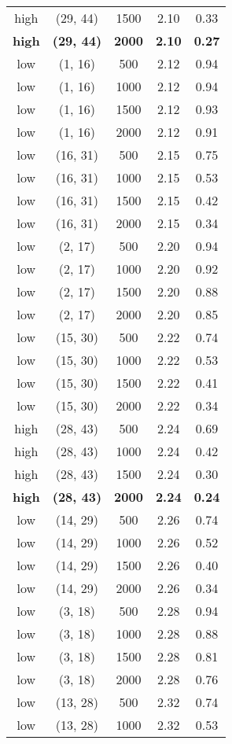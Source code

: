 \begin{tabular}{c c c c c}
high & (29, 44) &  1500 & 2.10 & 0.33 \\
\textbf{high} & \textbf{(29, 44)} & \textbf{ 2000} & \textbf{2.10} & \textbf{0.27} \\
low & (1, 16) &  500 & 2.12 & 0.94 \\
low & (1, 16) &  1000 & 2.12 & 0.94 \\
low & (1, 16) &  1500 & 2.12 & 0.93 \\
low & (1, 16) &  2000 & 2.12 & 0.91 \\
low & (16, 31) &  500 & 2.15 & 0.75 \\
low & (16, 31) &  1000 & 2.15 & 0.53 \\
low & (16, 31) &  1500 & 2.15 & 0.42 \\
low & (16, 31) &  2000 & 2.15 & 0.34 \\
low & (2, 17) &  500 & 2.20 & 0.94 \\
low & (2, 17) &  1000 & 2.20 & 0.92 \\
low & (2, 17) &  1500 & 2.20 & 0.88 \\
low & (2, 17) &  2000 & 2.20 & 0.85 \\
low & (15, 30) &  500 & 2.22 & 0.74 \\
low & (15, 30) &  1000 & 2.22 & 0.53 \\
low & (15, 30) &  1500 & 2.22 & 0.41 \\
low & (15, 30) &  2000 & 2.22 & 0.34 \\
high & (28, 43) &  500 & 2.24 & 0.69 \\
high & (28, 43) &  1000 & 2.24 & 0.42 \\
high & (28, 43) &  1500 & 2.24 & 0.30 \\
\textbf{high} & \textbf{(28, 43)} & \textbf{ 2000} & \textbf{2.24} & \textbf{0.24} \\
low & (14, 29) &  500 & 2.26 & 0.74 \\
low & (14, 29) &  1000 & 2.26 & 0.52 \\
low & (14, 29) &  1500 & 2.26 & 0.40 \\
low & (14, 29) &  2000 & 2.26 & 0.34 \\
low & (3, 18) &  500 & 2.28 & 0.94 \\
low & (3, 18) &  1000 & 2.28 & 0.88 \\
low & (3, 18) &  1500 & 2.28 & 0.81 \\
low & (3, 18) &  2000 & 2.28 & 0.76 \\
low & (13, 28) &  500 & 2.32 & 0.74 \\
low & (13, 28) &  1000 & 2.32 & 0.53 \\

\end{tabular}
